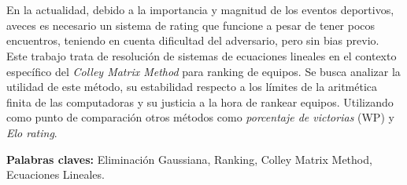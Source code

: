 \section*{\runtitulo}

\noindent En la actualidad, debido a la importancia y magnitud de los eventos deportivos, aveces es necesario un sistema de rating que funcione a pesar de tener pocos encuentros, teniendo en cuenta dificultad del adversario, pero sin bias previo. Este trabajo trata de resolución de sistemas de ecuaciones lineales en el contexto específico del \textit{Colley Matrix Method} para ranking de equipos. 
Se busca analizar la utilidad de este método, su estabilidad respecto a los límites de la aritmética finita de las computadoras y su justicia a la hora de rankear equipos. Utilizando como punto de comparación otros métodos como \textit{porcentaje de victorias} (WP) y \textit{Elo rating}. %

\bigskip

\noindent\textbf{Palabras claves:} Eliminación Gaussiana, Ranking, Colley Matrix Method, Ecuaciones Lineales.
